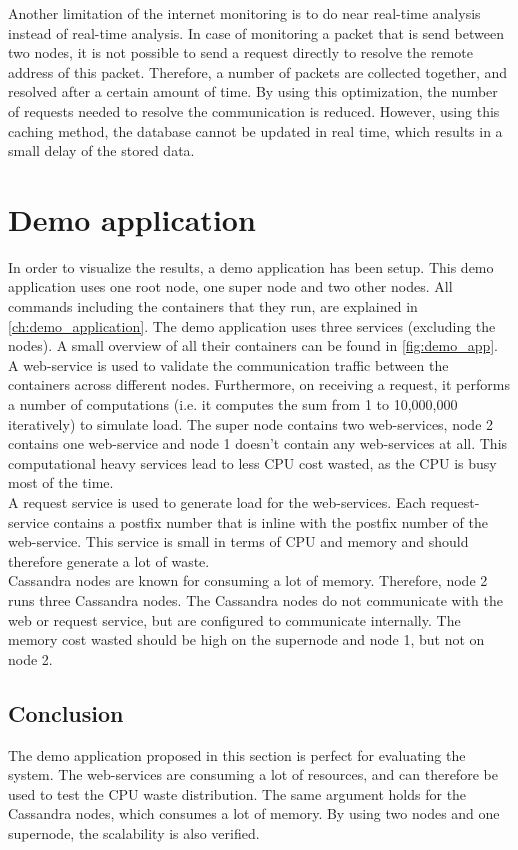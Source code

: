 \noindent
Another limitation of the internet monitoring is to do near real-time analysis instead of real-time analysis. In case of monitoring a packet that is send between two nodes, it is not possible to send a request directly to resolve the remote address of this packet. Therefore, a number of packets are collected together, and resolved after a certain amount of time. By using this optimization, the number of requests needed to resolve the communication is reduced. However, using this caching method, the database cannot be updated in real time, which results in a small delay of the stored data. 


\section{Demo application} \label{sec:demo_app}
In order to visualize the results, a demo application has been setup. This demo application uses one root node, one super node and two other nodes. All commands including the containers that they run, are explained in \autoref{ch:demo_application}. The demo application uses three services (excluding the nodes). A small overview of all their containers can be found in \autoref{fig:demo_app}.\\

\noindent
A web-service is used to validate the communication traffic between the containers across different nodes. Furthermore, on receiving a request, it performs a number of computations (i.e. it computes the sum from 1 to 10,000,000 iteratively) to simulate load. The super node contains two web-services, node 2 contains one web-service and node 1 doesn't contain any web-services at all. This computational heavy services lead to less CPU cost wasted, as the CPU is busy most of the time.\\

\noindent
A request service is used to generate load for the web-services. Each request-service contains a postfix number that is inline with the postfix number of the web-service. This service is small in terms of CPU and memory and should therefore generate a lot of waste.\\

\noindent
Cassandra nodes are known for consuming a lot of memory. Therefore, node 2 runs three Cassandra nodes. The Cassandra nodes do not communicate with the web or request service, but are configured to communicate internally. The memory cost wasted should be high on the supernode and node 1, but not on node 2.

\subsection{Conclusion}
The demo application proposed in this section is perfect for evaluating the system. The web-services are consuming a lot of resources, and can therefore be used to test the CPU waste distribution. The same argument holds for the Cassandra nodes, which consumes a lot of memory. By using two nodes and one supernode, the scalability is also verified.